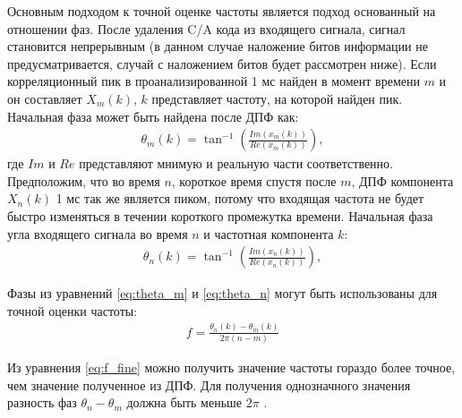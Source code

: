 Основным подходом к точной оценке частоты является подход основанный на отношении фаз. После удаления C/A кода
из входящего сигнала, сигнал становится непрерывным (в данном случае наложение битов информации не предусматривается,
случай с наложением битов будет рассмотрен ниже). Если корреляционный пик в проанализированной 1 мс найден в момент времени ${m}$
и он составляет ${X_m(k)}$, ${k}$ представляет частоту, на которой найден пик. Начальная фаза может быть найдена после ДПФ
как:
\begin{eqnarray}
\theta_m(k) = \tan^{-1}(\frac{Im(x_m(k))}{Re(x_m(k))}),
\label{eq:theta_m}
\end{eqnarray}
где ${Im}$ и ${Re}$ представляют мнимую и реальную части соответственно. Предположим, что во время ${n}$, короткое время спустя после ${m}$,
ДПФ компонента ${X_n(k)}$ 1 мс так же является пиком, потому что входящая частота не будет быстро изменяться в течении короткого промежутка 
времени. Начальная фаза угла входящего сигнала во время ${n}$ и частотная компонента ${k}$:
\begin{eqnarray}
\theta_n(k) = \tan^{-1}(\frac{Im(x_n(k))}{Re(x_n(k))}),
\label{eq:theta_n}
\end{eqnarray}

Фазы из уравнений \ref{eq:theta_m} и \ref{eq:theta_n} могут быть использованы для точной оценки частоты:
\begin{eqnarray}
f = \frac{\theta_n(k) - \theta_m(k)}{2\pi(n - m)}
\label{eq:f_fine}
\end{eqnarray}

Из уравнения \ref{eq:f_fine} можно получить значение частоты гораздо более точное, чем значение полученное из ДПФ. Для получения однозначного
значения разность фаз ${\theta_n - \theta_m}$ должна быть меньше ${2\pi}$ \cite{gps}.

